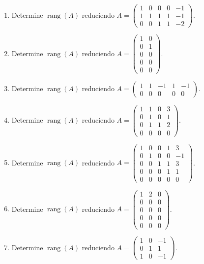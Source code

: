 \documentclass[12pt]{article}
\theoremstyle{remark}
\newcommand{\rang}{\operatorname{rang}}
\newcounter{contadorEjercicio}
\newenvironment{listaejercicios}{\begin{enumerate}[label=\textbf{E\arabic*.},leftmargin=2.4em,itemsep=0.52em]\setcounter{enumi}{\value{contadorEjercicio}}}{\setcounter{contadorEjercicio}{\value{enumi}}\end{enumerate}}
\begin{document}
\begin{listaejercicios}
\item Determine $\rang(A)$ reduciendo $A=\begin{pmatrix}1&0&0&0&-1\\1&1&1&1&-1\\0&0&1&1&-2\end{pmatrix}$.

\item Determine $\rang(A)$ reduciendo $A=\begin{pmatrix}1&0\\0&1\\0&0\\0&0\\0&0\end{pmatrix}$.

\item Determine $\rang(A)$ reduciendo $A=\begin{pmatrix}1&1&-1&1&-1\\0&0&0&0&0\end{pmatrix}$.

\item Determine $\rang(A)$ reduciendo $A=\begin{pmatrix}1&1&0&3\\0&1&0&1\\0&1&1&2\\0&0&0&0\end{pmatrix}$.

\item Determine $\rang(A)$ reduciendo $A=\begin{pmatrix}1&0&0&1&3\\0&1&0&0&-1\\0&0&1&1&3\\0&0&0&1&1\\0&0&0&0&0\end{pmatrix}$.

\item Determine $\rang(A)$ reduciendo $A=\begin{pmatrix}1&2&0\\0&0&0\\0&0&0\\0&0&0\\0&0&0\end{pmatrix}$.

\item Determine $\rang(A)$ reduciendo $A=\begin{pmatrix}1&0&-1\\0&1&1\\1&0&-1\end{pmatrix}$.


\end{listaejercicios}
\end{document}
